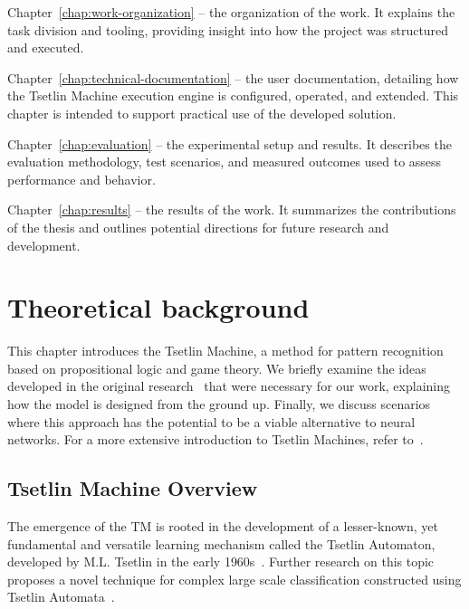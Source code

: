 \documentclass[english]{aghengthesis} %
\begin{document}
\par Chapter~\ref{chap:work-organization} -- the organization of the work. It explains the task division and tooling, providing insight into how the project was structured and executed. \\

\par Chapter~\ref{chap:technical-documentation} -- the user documentation, detailing how the Tsetlin Machine execution engine is configured, operated, and extended. This chapter is intended to support practical use of the developed solution. \\

\par Chapter~\ref{chap:evaluation} -- the experimental setup and results. It describes the evaluation methodology, test scenarios, and measured outcomes used to assess performance and behavior. \\

\par Chapter~\ref{chap:results} -- the results of the work. It summarizes the contributions of the thesis and outlines potential directions for future research and development. \\

\chapter{Theoretical background}
\label{chap:theoretical-background}
This chapter introduces the Tsetlin Machine, a method for pattern recognition based on propositional logic and game theory. We briefly examine the ideas developed in the original research~\cite{granmo2021tsetlinmachinegame, glimsdal2021coalescedmultioutputtsetlinmachines} that were necessary for our work, explaining how the model is designed from the ground up. Finally, we discuss scenarios where this approach has the potential to be a viable alternative to neural networks. For a more extensive introduction to Tsetlin Machines, refer to~\cite{granmo2022tsetlinmachinebookchap1, granmo2022tsetlinmachinebookchap2}.

\section{Tsetlin Machine Overview}
The emergence of the TM is rooted in the development of a lesser-known, yet fundamental and versatile learning mechanism called the Tsetlin Automaton, developed by M.L. Tsetlin in the early 1960s~\cite{granmo2021tsetlinmachinegame, tsetlin1961behaviour}. Further research on this topic proposes a novel technique for complex large scale classification constructed using Tsetlin Automata~\cite{granmo2021tsetlinmachinegame}.
\end{document}
